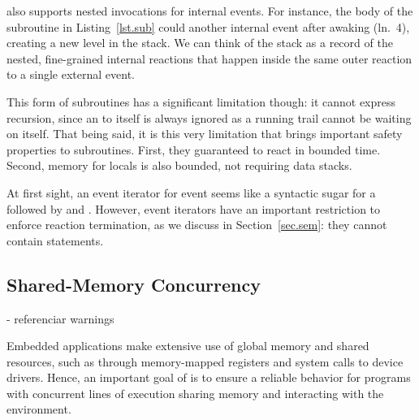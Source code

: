 
\CEU also supports nested  invocations for internal events.
%
For instance, the body of the subroutine  in Listing~\ref{lst.sub}
could  another internal event after awaking (ln.~4), creating a
new level in the stack.
%
We can think of the stack as a record of the nested, fine-grained internal
reactions that happen inside the same outer reaction to a single external
event.

This form of subroutines has a significant limitation though: it cannot
express recursion, since an  to itself is always ignored as a
running trail cannot be waiting on itself.
%
That being said, it is this very limitation that brings important safety
properties to subroutines.
%
First, they guaranteed to react in bounded time.
%
Second, memory for locals is also bounded, not requiring data stacks.

At first sight, an event iterator for event  seems like a syntactic
sugar for a  followed by and .
However, event iterators have an important restriction to enforce reaction
termination, as we discuss in Section~\ref{sec.sem}:
    they cannot contain  statements.

\subsection{Shared-Memory Concurrency}
    - referenciar warnings

Embedded applications make extensive use of global memory and shared resources,
such as through memory-mapped registers and system calls to device drivers.
Hence, an important goal of \CEU is to ensure a reliable behavior for programs
with concurrent lines of execution sharing memory and interacting with the
environment.

